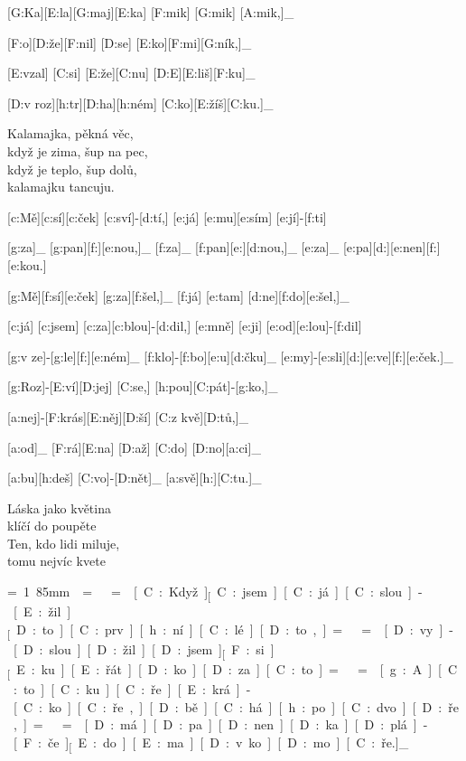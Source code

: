 
{\minw=6mm
[G:Ka][E:la][G:maj][E:ka] [F:mik] [G:mik] [A:mik,]_

[F:o][D:že][F:nil] [D:se] [E:ko][F:mi][G:ník,]_

[E:vzal] [C:si] [E:že][C:nu] [D:E][E:liš][F:ku]_

[D:v roz][h:tr][D:ha][h:ném] [C:ko][E:žíš][C:ku.]_
}

Kalamajka, pěkná věc,\\
když je zima, šup na pec,\\
když je teplo, šup dolů,\\
kalamajku tancuju.



{\minw=6mm
[c:Mě][c:sí][c:ček] [c:sví]-[d:tí,] %
[e:já] [e:mu][e:sím] [e:jí]-[f:ti]

\minw=5mm
[g:za]_ [g:pan][f:][e:nou,]_
[f:za]_ [f:pan][e:][d:nou,]_
[e:za]_ [e:pa][d:][e:nen][f:][e:kou.]

\minw=6mm
[g:Mě][f:sí][e:ček] [g:za][f:šel,]_
[f:já] [e:tam] [d:ne][f:do][e:šel,]_

[c:já] [c:jsem] [c:za][c:blou]-[d:dil,] %
[e:mně] [e:ji] [e:od][e:lou]-[f:dil]

\minw=5mm
[g:v ze]-[g:le][f:][e:ném]_
[f:klo]-[f:bo][e:u][d:čku]_
[e:my]-[e:sli][d:][e:ve][f:][e:ček.]_
}



{\minw=6mm
[g:Roz]-[E:ví][D:jej] [C:se,] [h:pou][C:pát]-[g:ko,]_

[a:nej]-[F:krás][E:něj][D:ší] [C:z kvě][D:tů,]_

[a:od]_ [F:rá][E:na] [D:až] [C:do] [D:no][a:ci]_

[a:bu][h:deš] [C:vo]-[D:nět]_ [a:svě][h:][C:tu.]_
}

Láska jako květina \\
klíčí do poupěte \\
Ten, kdo lidi miluje, \\
tomu nejvíc kvete



{\unit=1.85mm
\min=
\max=
[C:Když]_ [C:jsem] [C:já] [C:slou]-[E:žil]_ [D:to] [C:prv][h:ní] [C:lé][D:to,]_

\min=
\max=
[D:vy]-[D:slou][D:žil] [D:jsem]_ [F:si]_ [E:ku][E:řát][D:ko] [D:za] [C:to.]_

\min=
\max=
[g:A] [C:to] [C:ku][C:ře] [E:krá]-[C:ko][C:ře,] [D:bě][C:há] [h:po] [C:dvo][D:ře,]_

\min=
\max=
[D:má] [D:pa][D:nen][D:ka] [D:plá]-[F:če]_ [E:do][E:ma] [D:v ko][D:mo][C:ře.]_
}

